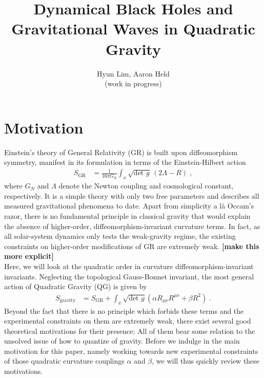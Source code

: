 \documentclass[a4paper,oneside,openany,11pt]{memoir}
\numberwithin{equation}{section} %
\newcommand{\aaron}[1]{{\color{OliveGreen} #1}}
\begin{document}
\title{\HUGE Dynamical Black Holes and Gravitational Waves in Quadratic Gravity}

\author{Hyun Lim, Aaron Held\\(work in progress)}


\maketitle


\section{Motivation}

Einstein's theory of General Relativity (GR) is built upon diffeomorphism symmetry, manifest in its formulation in terms of the Einstein-Hilbert action
\begin{align}
    S_{\text{GR}} &=
 \frac1{16\pi G_\text{N}}\int_x \sqrt{\text{det } g}\, (2\Lambda-R)\;,
\end{align}
where $G_N$ and $\Lambda$ denote the Newton coupling and cosmological constant, respectively. It is a simple theory with only two free parameters and describes all measured gravitational phenomena to date. Apart from simplicity a l\`a Occam's razor, there is no fundamental principle in classical gravity that would explain the absence of higher-order, diffeomorphism-invariant curvature terms. In fact, as all solar-system dynamics only tests the weak-gravity regime, the existing constraints on higher-order modifications of GR are extremely weak. \aaron{\textbf{[make this more explicit]}}
\\
Here, we will look at the quadratic order in curvature diffeomorphism-invariant invariants. Neglecting the topological Gauss-Bonnet invariant, the most general action of Quadratic Gravity (QG) is given by
\begin{align}
    S_{\text{gravity}} &=
 S_\text{GR}
 + \int_x \sqrt{\text{det }g} \left(\alpha  R_{\mu\nu}R^{\mu\nu} + \beta  R^2\right)  \;. 
\end{align}
Beyond the fact that there is no principle which forbids these terms and the experimental constraints on them are extremely weak, there exist several good theoretical motivations for their presence: All of them bear some relation to the unsolved issue of how to quantize of gravity. Before we indulge in the main motivation for this paper, namely working towards new experimental constraints of those quadratic curvature couplings $\alpha$ and $\beta$, we will thus quickly review these motivations.
\end{document}
